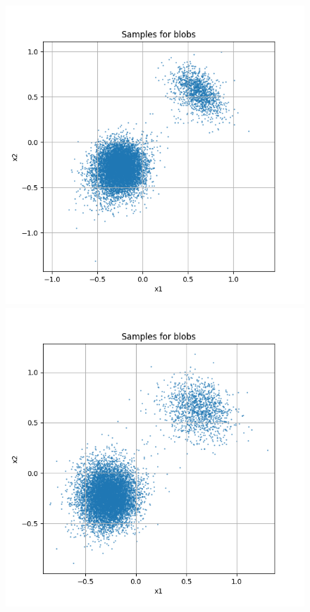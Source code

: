 \documentclass[a4paper,12pt]{article}
\begin{document}
\begin{figure}[H]
  \begin{minipage}{0.3\textwidth}
      \centering
      \includegraphics[width=\linewidth]{"images/Samples for ddpm_2_200_0.0005_0.02_blobs_linear.png"}
  \end{minipage}
  \begin{minipage}{0.3\textwidth}
      \centering
      \includegraphics[width=\linewidth]{"images/Samples for ddpm_2_200_0.0005_0.05_blobs_linear.png"}

\end{minipage}
\end{figure}
\end{document}
